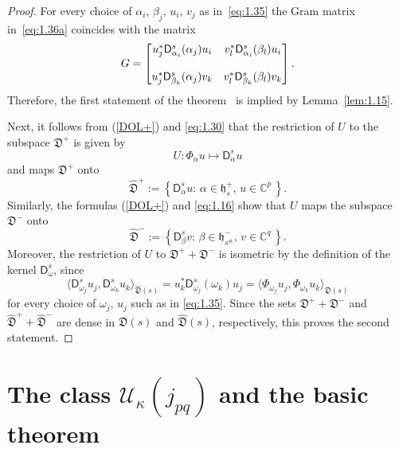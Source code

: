 \documentclass[12pt,twoside,a4paper]{amsart}
\theoremstyle{definition}
\numberwithin{equation}{section}
\begin{document}
\begin{proof}
For every choice of $\alpha_i,\,\beta_j,\,u_i,\,v_j$ as in~\eqref{eq:1.35}
the Gram matrix in~\eqref{eq:1.36a} coincides with the matrix
\[
G=\begin{bmatrix}{{\displaystyle} u_j^*{\mathsf D}^s_{\alpha_i}(\alpha_j)u_i}
&{{\displaystyle}
v_l^*{\mathsf D}^s_{\alpha_i}(\beta_l)u_i}\\
& \\
 {{\displaystyle} u_j^*{\mathsf D}^s_{\beta_k}(\alpha_j)v_k} & {{\displaystyle}
v_l^*{\mathsf D}^s_{\beta_k}(\beta_l)v_k}
\end{bmatrix}.
\]
Therefore, the first statement of the theorem~ is implied by
Lemma~\ref{lem:1.15}.

Next, it follows from (\ref{DOL+}) and \eqref{eq:1.30} that the restriction of
$U$ to the subspace ${{\mathfrak D}}^+$ is given by
\begin{equation}\label{eq:1.31a}
  U:\Phi_\alpha u\mapsto{\mathsf D}_\alpha^su
\end{equation}
and maps ${{\mathfrak D}}^+$ onto
\[
{{{\widehat {{\mathfrak D}}} }}^+:=\left\{{\mathsf D}_\alpha^su:\,\alpha\in{{\mathfrak h}}_s^+,\,u\in{{\mathbb C}}^p\,
\right\}.
\]
Similarly, the formulas (\ref{DOL+}) and \eqref{eq:1.16} show that  $U$
maps the subspace ${{\mathfrak D}}^-$  onto
\[
{{{\widehat {{\mathfrak D}}} }}^-:=\left\{{\mathsf D}_\beta^sv:\,\beta\in{{\mathfrak h}}_{s^\#}^-,\,v\in{{\mathbb C}}^q\, \right\}.
\]
Moreover, the restriction of $U$ to ${{\mathfrak D}}^++{{\mathfrak D}}^-$ is isometric by the definition of the kernel ${\mathsf D}_{\omega}^s$, since
\begin{equation}\label{eq:1.32}
  \langle{\mathsf D}_{{\omega}_j}^su_j,{\mathsf D}_{{\omega}_k}^su_k\rangle_{{{{\widehat {{\mathfrak D}}} }}(s)}=u_k^*{\mathsf D}_{{\omega}_j}^s({\omega}_k)u_j
=\langle\Phi_{{\omega}_j}u_j,\Phi_{{\omega}_k}u_k\rangle_{{{\mathfrak D}}(s)}
\end{equation}
for every choice of $\omega_j$, $u_j$ such as in \eqref{eq:1.35}. Since the sets ${{\mathfrak D}}^++{{\mathfrak D}}^-$ and ${{{\widehat {{\mathfrak D}}} }}^++{{{\widehat {{\mathfrak D}}} }}^-$ are dense in ${{\mathfrak D}}(s)$ and ${{{\widehat {{\mathfrak D}}} }}(s)$, respectively, this proves the second statement.
\end{proof}

\section{The class ${{\mathcal U}}_\kappa(j_{pq})$  and the basic theorem}\label{Sec3}
\end{document}
